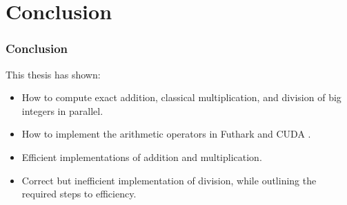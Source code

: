 \section{Conclusion}
\begin{frame}
  \frametitle{Conclusion}
  This thesis has shown:
        \begin{itemize}
            \item How to compute exact addition, classical multiplication, and division of big integers in parallel.
                \pause
              \item How to implement the arithmetic operators in Futhark and CUDA \cpp.
                \pause
              \item Efficient implementations of addition and multiplication.
                \pause
              \item Correct but inefficient implementation of division, while outlining the required steps to efficiency.
        \end{itemize}
\end{frame}
